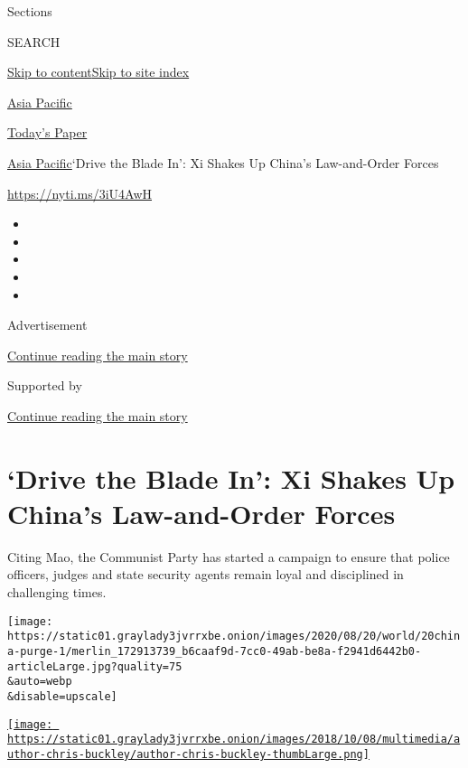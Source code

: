 Sections

SEARCH

\protect\hyperlink{site-content}{Skip to
content}\protect\hyperlink{site-index}{Skip to site index}

\href{https://www.nytimes3xbfgragh.onion/section/world/asia}{Asia
Pacific}

\href{https://myaccount.nytimes3xbfgragh.onion/auth/login?response_type=cookie\&client_id=vi}{}

\href{https://www.nytimes3xbfgragh.onion/section/todayspaper}{Today's
Paper}

\href{/section/world/asia}{Asia Pacific}\textbar{}`Drive the Blade In':
Xi Shakes Up China's Law-and-Order Forces

\url{https://nyti.ms/3iU4AwH}

\begin{itemize}
\item
\item
\item
\item
\item
\end{itemize}

Advertisement

\protect\hyperlink{after-top}{Continue reading the main story}

Supported by

\protect\hyperlink{after-sponsor}{Continue reading the main story}

\hypertarget{drive-the-blade-in-xi-shakes-up-chinas-law-and-order-forces}{%
\section{`Drive the Blade In': Xi Shakes Up China's Law-and-Order
Forces}\label{drive-the-blade-in-xi-shakes-up-chinas-law-and-order-forces}}

Citing Mao, the Communist Party has started a campaign to ensure that
police officers, judges and state security agents remain loyal and
disciplined in challenging times.

\texttt{[image: https://static01.graylady3jvrrxbe.onion/images/2020/08/20/world/20china-purge-1/merlin\_172913739\_b6caaf9d-7cc0-49ab-be8a-f2941d6442b0-articleLarge.jpg?quality=75\\\&auto=webp\\\&disable=upscale]}

\href{https://www.nytimes3xbfgragh.onion/by/chris-buckley}{\texttt{[image: https://static01.graylady3jvrrxbe.onion/images/2018/10/08/multimedia/author-chris-buckley/author-chris-buckley-thumbLarge.png]}}

